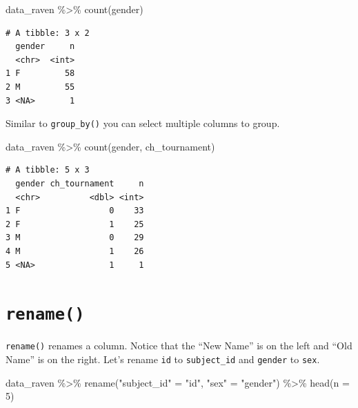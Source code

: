 \documentclass[
  letterpaper,
]{book}
\newenvironment{Shaded}{\begin{snugshade}}{\end{snugshade}}
\newcommand{\AttributeTok}[1]{\textcolor[rgb]{0.40,0.45,0.13}{#1}}
\newcommand{\DecValTok}[1]{\textcolor[rgb]{0.68,0.00,0.00}{#1}}
\newcommand{\FunctionTok}[1]{\textcolor[rgb]{0.28,0.35,0.67}{#1}}
\newcommand{\NormalTok}[1]{\textcolor[rgb]{0.00,0.23,0.31}{#1}}
\newcommand{\OtherTok}[1]{\textcolor[rgb]{0.00,0.23,0.31}{#1}}
\newcommand{\SpecialCharTok}[1]{\textcolor[rgb]{0.37,0.37,0.37}{#1}}
\newcommand{\StringTok}[1]{\textcolor[rgb]{0.13,0.47,0.30}{#1}}
\begin{document}
\begin{Shaded}
\begin{Highlighting}[]
\NormalTok{data\_raven }\SpecialCharTok{\%\textgreater{}\%} \FunctionTok{count}\NormalTok{(gender)}
\end{Highlighting}
\end{Shaded}

\begin{verbatim}
# A tibble: 3 x 2
  gender     n
  <chr>  <int>
1 F         58
2 M         55
3 <NA>       1
\end{verbatim}

Similar to \texttt{group\_by()} you can select multiple columns to
group.

\begin{Shaded}
\begin{Highlighting}[]
\NormalTok{data\_raven }\SpecialCharTok{\%\textgreater{}\%} \FunctionTok{count}\NormalTok{(gender, ch\_tournament)}
\end{Highlighting}
\end{Shaded}

\begin{verbatim}
# A tibble: 5 x 3
  gender ch_tournament     n
  <chr>          <dbl> <int>
1 F                  0    33
2 F                  1    25
3 M                  0    29
4 M                  1    26
5 <NA>               1     1
\end{verbatim}

\hypertarget{rename}{%
\section{\texorpdfstring{\texttt{rename()}}{rename()}}\label{rename}}

\texttt{rename()} renames a column. Notice that the ``New Name'' is on
the left and ``Old Name'' is on the right. Let's rename \texttt{id} to
\texttt{subject\_id} and \texttt{gender} to \texttt{sex}.

\begin{Shaded}
\begin{Highlighting}[]
\NormalTok{data\_raven }\SpecialCharTok{\%\textgreater{}\%} \FunctionTok{rename}\NormalTok{(}\StringTok{"subject\_id"} \OtherTok{=} \StringTok{"id"}\NormalTok{, }\StringTok{"sex"} \OtherTok{=} \StringTok{"gender"}\NormalTok{) }\SpecialCharTok{\%\textgreater{}\%} \FunctionTok{head}\NormalTok{(}\AttributeTok{n =} \DecValTok{5}\NormalTok{)}
\end{Highlighting}
\end{Shaded}
\end{document}

